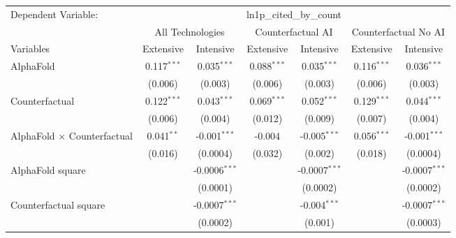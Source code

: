 \begingroup
\centering
\begin{tabular}{lcccccc}
   \tabularnewline \midrule \midrule
   Dependent Variable: & \multicolumn{6}{c}{ln1p\_cited\_by\_count}\\
 & \multicolumn{2}{c}{All Technologies} & \multicolumn{2}{c}{Counterfactual AI} & \multicolumn{2}{c}{Counterfactual No AI} \\
\cmidrule(lr){1-1}\cmidrule(lr){2-3} \cmidrule(lr){4-5} \cmidrule(lr){6-7}
Variables & \multicolumn{1}{c}{Extensive} & \multicolumn{1}{c}{Intensive} & \multicolumn{1}{c}{Extensive} & \multicolumn{1}{c}{Intensive} & \multicolumn{1}{c}{Extensive} & \multicolumn{1}{c}{Intensive} \\
\cmidrule(lr){1-1}\cmidrule(lr){2-2} \cmidrule(lr){3-3} \cmidrule(lr){4-4} \cmidrule(lr){5-5} \cmidrule(lr){6-6} \cmidrule(lr){7-7}
   AlphaFold                          & 0.117$^{***}$ & 0.035$^{***}$     & 0.088$^{***}$ & 0.035$^{***}$    & 0.116$^{***}$ & 0.036$^{***}$\\   
                                      & (0.006)       & (0.003)           & (0.006)       & (0.003)          & (0.006)       & (0.003)\\   
   Counterfactual                     & 0.122$^{***}$ & 0.043$^{***}$     & 0.069$^{***}$ & 0.052$^{***}$    & 0.129$^{***}$ & 0.044$^{***}$\\   
                                      & (0.006)       & (0.004)           & (0.012)       & (0.009)          & (0.007)       & (0.004)\\   
   AlphaFold $\times$ Counterfactual  & 0.041$^{**}$  & -0.001$^{***}$    & -0.004        & -0.005$^{***}$   & 0.056$^{***}$ & -0.001$^{***}$\\   
                                      & (0.016)       & (0.0004)          & (0.032)       & (0.002)          & (0.018)       & (0.0004)\\   
   AlphaFold square                   &               & -0.0006$^{***}$   &               & -0.0007$^{***}$  &               & -0.0007$^{***}$\\   
                                      &               & (0.0001)          &               & (0.0002)         &               & (0.0002)\\   
   Counterfactual square              &               & -0.0007$^{***}$   &               & -0.004$^{***}$   &               & -0.0007$^{***}$\\   
                                      &               & (0.0002)          &               & (0.001)          &               & (0.0003)\\   

\end{tabular}
